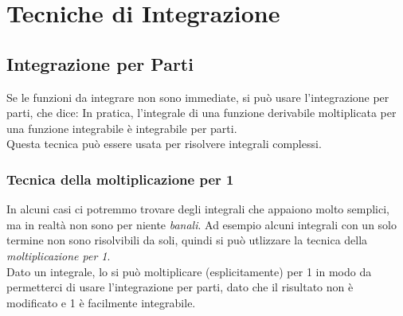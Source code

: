 \documentclass[12pt, a4paper, openany]{book}
\begin{document}
\section{Tecniche di Integrazione}
\subsection{Integrazione per Parti}
Se le funzioni da integrare non sono immediate, si può usare l'integrazione per parti, che dice:
In pratica, l'integrale di una funzione derivabile moltiplicata per una funzione integrabile è integrabile per parti.
\\Questa tecnica può essere usata per risolvere integrali complessi.
\subsubsection*{Tecnica della moltiplicazione per 1}
In alcuni casi ci potremmo trovare degli integrali che appaiono molto semplici, ma in realtà non sono per niente \emph{banali}.
Ad esempio alcuni integrali con un solo termine non sono risolvibili da soli, quindi si può utlizzare la tecnica della \emph{moltiplicazione per 1}.
\\Dato un integrale, lo si può moltiplicare (esplicitamente) per 1 in modo da permetterci di usare l'integrazione per parti, dato che il risultato non è modificato e 1 è facilmente integrabile.
\end{document}
